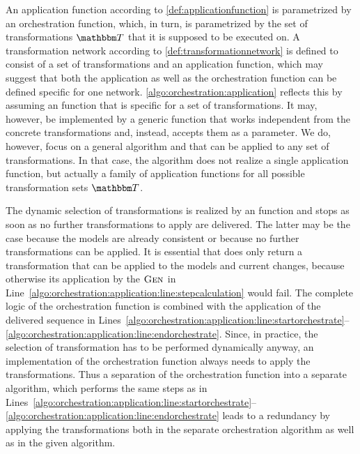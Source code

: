 An application function according to \autoref{def:applicationfunction} is parametrized by an orchestration function, which, in turn, is parametrized by the set of transformations $\transformationset{T}$ that it is supposed to be executed on.
A transformation network according to \autoref{def:transformationnetwork} is defined to consist of a set of transformations and an application function, which may suggest that both the application as well as the orchestration function can be defined specific for one network.
\autoref{algo:orchestration:application} reflects this by assuming an  function that is specific for a set of transformations.
It may, however, be implemented by a generic function that works independent from the concrete transformations and, instead, accepts them as a parameter.
We do, however, focus on a general algorithm and  that can be applied to any set of transformations.
In that case, the algorithm does not realize a single application function, but actually a family of application functions for all possible transformation sets $\transformationset{T}$.

The dynamic selection of transformations is realized by an  function and stops as soon as no further transformations to apply are delivered.
The latter may be the case because the models are already consistent or because no further transformations can be applied.
It is essential that  does only return a transformation that can be applied to the models and current changes, because otherwise its application by the $\textsc{Gen}_{}$ in Line~\ref{algo:orchestration:application:line:stepcalculation} would fail.
The complete logic of the orchestration function is combined with the application of the delivered sequence in Lines~\ref{algo:orchestration:application:line:startorchestrate}--\ref{algo:orchestration:application:line:endorchestrate}.
Since, in practice, the selection of transformation has to be performed dynamically anyway, an implementation of the orchestration function always needs to apply the transformations.
Thus a separation of the orchestration function into a separate algorithm, which performs the same steps as in Lines~\ref{algo:orchestration:application:line:startorchestrate}--\ref{algo:orchestration:application:line:endorchestrate} leads to a redundancy by applying the transformations both in the separate orchestration algorithm as well as in the given algorithm.

